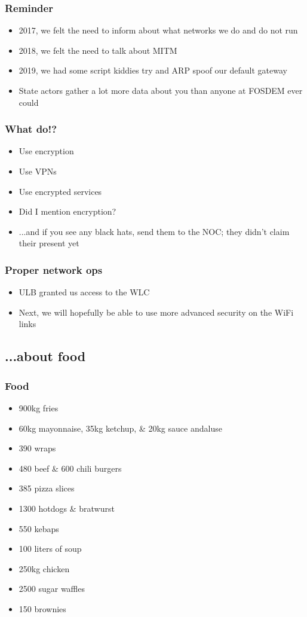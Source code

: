 \documentclass[aspectratio=169]{beamer}
\begin{document}
\begin{frame}
	\frametitle{Reminder}
	\vfill
	\begin{itemize}
		\item 2017, we felt the need to inform about what networks we do and do not run
		\item 2018, we felt the need to talk about MITM
		\item 2019, we had some script kiddies try and ARP spoof our default gateway
		\item State actors gather a lot more data about you than anyone at FOSDEM ever could
	\end{itemize}
	\vfill
\end{frame}

\begin{frame}
	\frametitle{What do!?}
	\vfill
	\begin{itemize}
		\item Use encryption
		\item Use VPNs
		\item Use encrypted services
		\item Did I mention encryption?
		\item ...and if you see any black hats, send them to the NOC; they didn't claim their present yet
	\end{itemize}
	\vfill
\end{frame}

\begin{frame}
	\frametitle{Proper network ops}
	\vfill
	\begin{itemize}
		\item ULB granted us access to the WLC
		\item Next, we will hopefully be able to use more advanced security on the WiFi links
	\end{itemize}
	\vfill
\end{frame}

\subsection{...about food}

\begin{frame}
	\frametitle{Food}
	\vfill
	\begin{itemize}
		\item 900kg fries
		\item 60kg mayonnaise, 35kg ketchup, \& 20kg sauce andaluse
		\item 390 wraps
		\item 480 beef \& 600 chili burgers
		\item 385 pizza slices
		\item 1300 hotdogs \& bratwurst
		\item 550 kebaps
		\item 100 liters of soup
		\item 250kg chicken
		\item 2500 sugar waffles
		\item 150 brownies
	\end{itemize}
	\vfill
\end{frame}
\end{document}
